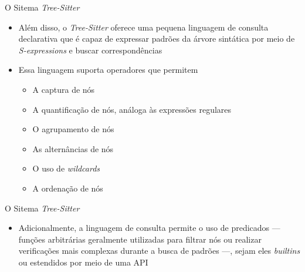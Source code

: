 \documentclass
  [ aspectratio=169,
    english,
    hyperref={citecolor=blue,colorlinks=true,linkcolor=blue,urlcolor=blue},
    brazil]
  {beamer}
\newcommand{\treesitter}{\textit{Tree-Sitter}\xspace}
\begin{document}
  \begin{frame}{O Sitema \treesitter}
    \begin{itemize}
      \item Além disso, o \treesitter oferece uma pequena linguagem de
            consulta declarativa que é capaz de expressar padrões da árvore
            sintática por meio de \textit{S-expressions} e buscar
            correspondências
      \item Essa linguagem suporta operadores que permitem
            \begin{itemize}
              \item A captura de nós
              \item A quantificação de nós, análoga às expressões regulares
              \item O agrupamento de nós
              \item As alternâncias de nós
              \item O uso de \textit{wildcards}
              \item A ordenação de nós
            \end{itemize}
    \end{itemize}
  \end{frame}

  \begin{frame}{O Sitema \treesitter}
    \begin{itemize}
      \item Adicionalmente, a linguagem de consulta permite o uso de predicados
            --- funções arbitrárias geralmente utilizadas para filtrar nós ou
            realizar verificações mais complexas durante a busca de padrões
            ---, sejam eles \textit{builtins} ou estendidos por meio de uma API
    \end{itemize}
  \end{frame}

\end{document}
